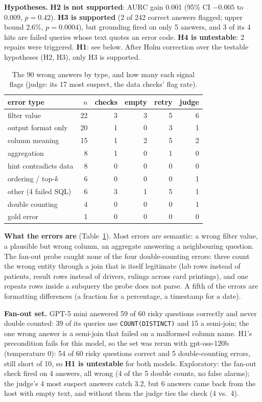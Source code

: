 \documentclass[10pt,twocolumn]{article}
\begin{document}
\textbf{Hypotheses.} \textbf{H2 is not supported}: AURC gain 0.001 (95\% CI $-0.005$ to $0.009$,
$p=0.42$). \textbf{H3 is supported} (2 of 242 correct answers flagged; upper bound 2.6\%,
$p=0.0004$), but grounding fired on only 5 answers, and 3 of its 4 hits are failed queries whose text
quotes an error code. \textbf{H4 is untestable}: 2 repairs were triggered. \textbf{H1}: see below.
After Holm correction over the testable hypotheses (H2, H3), only H3 is supported.

\begin{table}[t]
\centering\small
\setlength{\tabcolsep}{3pt}
\begin{tabular}{lrrrrr}
\toprule
error type & $n$ & checks & empty & retry & judge \\
\midrule
filter value & 22 & 3 & 3 & 5 & 6 \\
output format only & 20 & 1 & 0 & 3 & 1 \\
column meaning & 15 & 1 & 2 & 5 & 2 \\
aggregation & 8 & 1 & 0 & 1 & 0 \\
hint contradicts data & 8 & 0 & 0 & 0 & 0 \\
ordering / top-$k$ & 6 & 0 & 0 & 0 & 1 \\
other (4 failed SQL) & 6 & 3 & 1 & 5 & 1 \\
double counting & 4 & 0 & 0 & 0 & 1 \\
gold error & 1 & 0 & 0 & 0 & 0 \\
\bottomrule
\end{tabular}
\caption{The 90 wrong answers by type, and how many each signal flags (judge: its 17 most suspect,
the data checks' flag rate).}
\label{tab:errors}
\end{table}

\textbf{What the errors are} (Table~\ref{tab:errors}). Most errors are semantic: a wrong filter
value, a plausible but wrong column, an aggregate answering a neighbouring question. The fan-out probe
caught none of the four double-counting errors: three count the wrong entity through a join that is
itself legitimate (lab rows instead of patients, result rows instead of drivers, rulings across card
printings), and one repeats rows inside a subquery the probe does not parse. A fifth of the errors are
formatting differences (a fraction for a percentage, a timestamp for a date).

\textbf{Fan-out set.} GPT-5 mini answered 59 of 60 risky questions correctly and never double
counted: 39 of its queries use \texttt{COUNT(DISTINCT)} and 15 a semi-join; the one wrong answer is a
semi-join that failed on a malformed column name. H1's precondition fails for this model, so the set
was rerun with gpt-oss-120b (temperature 0): 54 of 60 risky questions correct and 5 double-counting errors, still
short of 10, so \textbf{H1 is untestable} for both models. Exploratory: the fan-out check fired on 4
answers, all wrong (4 of the 5 double counts, no false alarms); the judge's 4 most suspect answers
catch 3.2, but 6 answers came back from the host with empty text, and without them the judge ties the
check (4 vs.\ 4).
\end{document}
